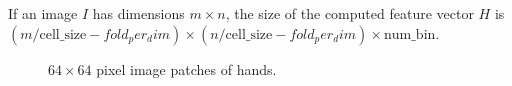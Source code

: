 If an image $I$ has dimensions $m\times n$, the size of the computed feature
vector $H$ is $(m/\text{cell\_size} - fold_per_dim) \times (n/\text{cell\_size}
- fold_per_dim) \times \text{num\_bin}$.

\begin{figure}[tbh]
  \centering
  \caption{$64\times64$ pixel image patches of hands.} \label{fig:hand}
\end{figure}

